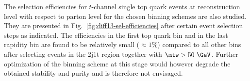 
The selection efficiencies for $t$-channel single top quark events at reconstruction level with respect to parton level for the chosen binning schemes are also studied. They are presented in Fig.~\ref{fig:diff13-sel-efficiencies} after certain event selection steps as indicated. The efficiencies in the first top quark \pt bin and in the last rapidity bin are found to be relatively small ($\approx 1\%$)  compared to all other bins after selecting events in the 2j1t region together with $\mtw>50~\GeV$. Further optimization of the binning scheme at this stage would however degrade the obtained stability and purity and is therefore not envisaged.

